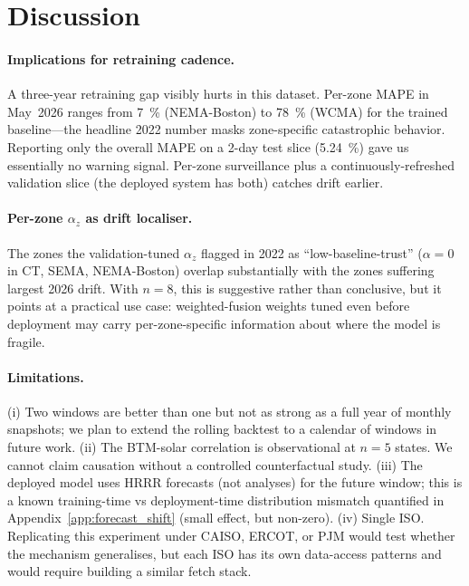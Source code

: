 
\section{Discussion}
\label{sec:discussion}

\paragraph{Implications for retraining cadence.}
A three-year retraining gap visibly hurts in this dataset. Per-zone
MAPE in May~2026 ranges from 7~\% (NEMA-Boston) to 78~\% (WCMA) for the
trained baseline---the headline 2022 number masks zone-specific
catastrophic behavior. Reporting only the overall MAPE on a 2-day test
slice (5.24~\%) gave us essentially no warning signal. Per-zone
surveillance plus a continuously-refreshed validation slice (the
deployed system has both) catches drift earlier.

\paragraph{Per-zone $\alpha_z$ as drift localiser.}
The zones the validation-tuned $\alpha_z$ flagged in 2022 as
``low-baseline-trust'' ($\alpha = 0$ in CT, SEMA, NEMA-Boston) overlap
substantially with the zones suffering largest 2026 drift. With $n =
8$, this is suggestive rather than conclusive, but it points at a
practical use case: weighted-fusion weights tuned even before
deployment may carry per-zone-specific information about where the
model is fragile.

\paragraph{Limitations.}
(i) Two windows are better than one but not as strong as a full year
of monthly snapshots; we plan to extend the rolling backtest to a
calendar of windows in future work.
(ii) The BTM-solar correlation is observational at $n = 5$ states. We
cannot claim causation without a controlled counterfactual study.
(iii) The deployed model uses HRRR forecasts (not analyses) for the
future window; this is a known training-time vs deployment-time
distribution mismatch quantified in Appendix~\ref{app:forecast_shift}
(small effect, but non-zero).
(iv) Single ISO. Replicating this experiment under CAISO, ERCOT, or
PJM would test whether the mechanism generalises, but each ISO has its
own data-access patterns and would require building a similar fetch
stack.

